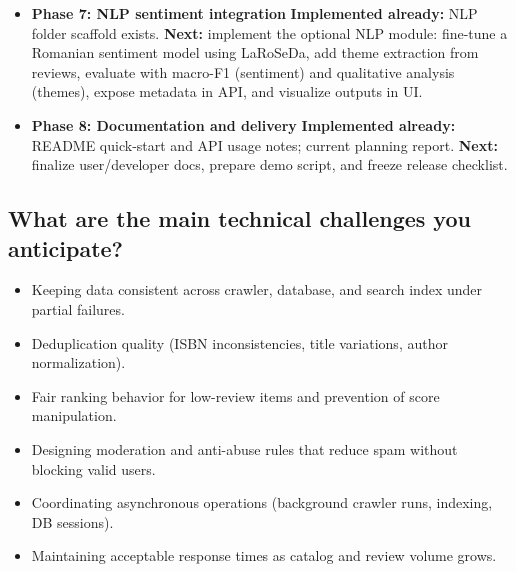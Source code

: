 \documentclass[12pt,a4paper]{article}
\begin{document}
\begin{itemize}[leftmargin=*]
	\item \textbf{Phase 7: NLP sentiment integration}
	\textbf{Implemented already:} NLP folder scaffold exists.
	\textbf{Next:} implement the optional NLP module: fine-tune a Romanian sentiment model using LaRoSeDa, add theme extraction from reviews, evaluate with macro-F1 (sentiment) and qualitative analysis (themes), expose metadata in API, and visualize outputs in UI.

	\item \textbf{Phase 8: Documentation and delivery}
	\textbf{Implemented already:} README quick-start and API usage notes; current planning report.
	\textbf{Next:} finalize user/developer docs, prepare demo script, and freeze release checklist.
\end{itemize}

\subsection{What are the main technical challenges you anticipate?}
\begin{itemize}[leftmargin=*]
	\item Keeping data consistent across crawler, database, and search index under partial failures.
	\item Deduplication quality (ISBN inconsistencies, title variations, author normalization).
	\item Fair ranking behavior for low-review items and prevention of score manipulation.
	\item Designing moderation and anti-abuse rules that reduce spam without blocking valid users.
	\item Coordinating asynchronous operations (background crawler runs, indexing, DB sessions).
	\item Maintaining acceptable response times as catalog and review volume grows.
\end{itemize}
\end{document}

